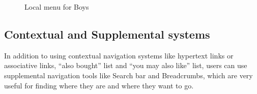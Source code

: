 \begin{figure}[h!]
  \centering
  \caption{Local menu for Boys}
  \label{fig:localMenu}
\end{figure}

\subsection{Contextual and Supplemental systems}
In addition to using contextual navigation systems like hypertext links or associative links, ``also bought'' list and ``you may also like'' list, users can use supplemental navigation tools like Search bar and Breadcrumbs, which are very useful for finding where they are and where they want to go.


